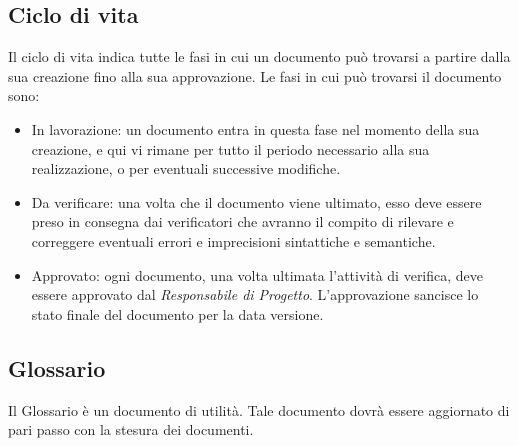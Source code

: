 \subsection{Ciclo di vita}
Il ciclo di vita indica tutte le fasi in cui un documento può trovarsi a partire dalla sua creazione fino alla sua approvazione. Le fasi in cui può trovarsi il documento sono:
\begin{itemize}
	\item In lavorazione: un documento entra in questa fase nel momento della sua creazione, e qui vi rimane per tutto il periodo necessario alla sua realizzazione, o per eventuali successive modifiche. 
	\item Da verificare: una volta che il documento viene ultimato, esso deve essere preso in consegna dai verificatori che avranno il compito di rilevare e correggere eventuali errori e imprecisioni sintattiche e semantiche. 
	\item Approvato: ogni documento, una volta ultimata l'attività di verifica, deve essere approvato dal \textit{Responsabile di Progetto}. L'approvazione sancisce lo stato finale del documento per la data versione.
\end{itemize}

\subsection{Glossario}
Il Glossario è un documento di utilità. Tale documento dovrà essere aggiornato di pari passo con la stesura dei documenti.
